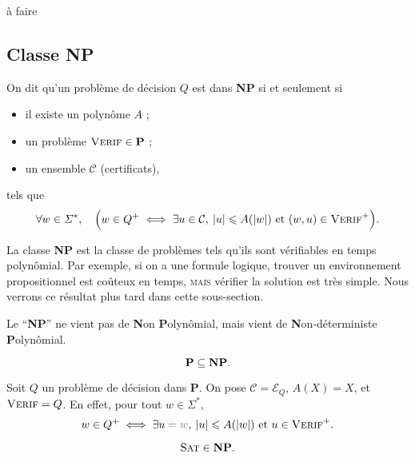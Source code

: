 \begin{prv}
	à faire
\end{prv}

\subsection{Classe \textbf{NP}}

\begin{defn}
	On dit qu'un problème de décision $Q$\/ est dans \textbf{NP} si et seulement si
	\begin{itemize}
		\item il existe un polynôme $A$ ;
		\item un problème $\textsc{Verif} \in \text{\textbf{P}}$ ;
		\item un ensemble $\mathcal{C}$\/ (certificats),
	\end{itemize}
	tels que \[
		\forall w \in \Sigma^*,\quad\Big(w \in Q^+ \iff \exists u \in \mathcal{C},\:|u| \le A(|w|) \text{ et } (w,u) \in \textsc{Verif}^+\Big)
	.\] 
\end{defn}

La classe \textbf{NP} est la classe de problèmes tels qu'ils sont vérifiables en temps polynômial. Par exemple, si on a une formule logique, trouver un environnement propositionnel est coûteux en temps, \textsc{mais} vérifier la solution est très simple. Nous verrons ce résultat plus tard dans cette sous-section.

Le ``\textbf{NP}'' {\color{red}ne vient pas} de \textbf{N}on \textbf{P}olynômial, mais vient de \textbf{N}on-déterministe \textbf{P}olynômial.

\begin{prop}
	\[
		\text{\textbf{P}} \subseteq \text{\textbf{NP}}
	.\]
\end{prop}

\begin{prv} 
	Soit $Q$\/ un problème de décision dans \textbf{P}. On pose $\mathcal{C} = \mathcal{E}_Q$, $A(X) = X$, et $\textsc{Verif} = Q$. En effet, pour tout $w \in \Sigma^*$, \[
		w \in Q^+ \iff \exists u {\color{gray}{} = w},\: |u| \le A(|w|) \text{ et } u \in \textsc{Verif}^+
	.\]
\end{prv}

\begin{prop}
	\[
		\textsc{Sat} \in \text{\textbf{NP}}
	.\]
\end{prop}

